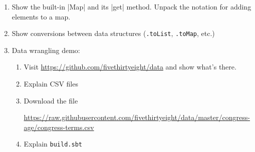 \begin{instructor}
\begin{enumerate}
  \item Show the built-in \scalainline|Map| and its \scalainline|get|
    method. Unpack the notation for adding elements to a map.

  \item Show conversions between data structures (\lstinline|.toList|,
    \lstinline|.toMap|, etc.)

  \item Data wrangling demo:

    \begin{enumerate}

      
  \item Visit \url{https://github.com/fivethirtyeight/data} and show what's
  there.

  \item Explain CSV files

  \item Download the file

  \url{https://raw.githubusercontent.com/fivethirtyeight/data/master/congress-age/congress-terms.csv}

  \item Explain \texttt{build.sbt}

\end{enumerate}


\end{enumerate}
  
\end{instructor}

